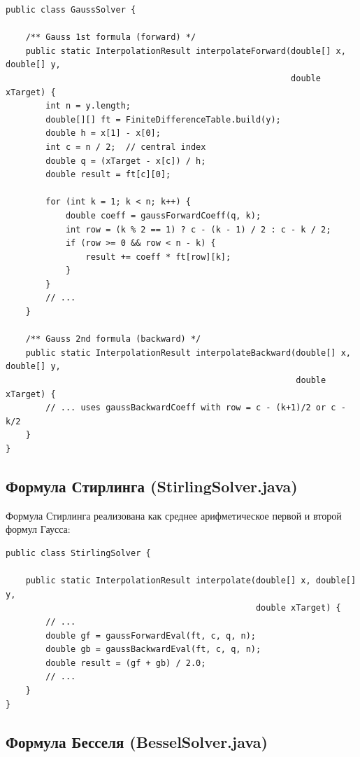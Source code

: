 \begin{lstlisting}[style=javaStyle, label=code:gauss]
public class GaussSolver {

    /** Gauss 1st formula (forward) */
    public static InterpolationResult interpolateForward(double[] x, double[] y,
                                                         double xTarget) {
        int n = y.length;
        double[][] ft = FiniteDifferenceTable.build(y);
        double h = x[1] - x[0];
        int c = n / 2;  // central index
        double q = (xTarget - x[c]) / h;
        double result = ft[c][0];

        for (int k = 1; k < n; k++) {
            double coeff = gaussForwardCoeff(q, k);
            int row = (k % 2 == 1) ? c - (k - 1) / 2 : c - k / 2;
            if (row >= 0 && row < n - k) {
                result += coeff * ft[row][k];
            }
        }
        // ...
    }

    /** Gauss 2nd formula (backward) */
    public static InterpolationResult interpolateBackward(double[] x, double[] y,
                                                          double xTarget) {
        // ... uses gaussBackwardCoeff with row = c - (k+1)/2 or c - k/2
    }
}
\end{lstlisting}

\subsection{Формула Стирлинга (StirlingSolver.java)}

Формула Стирлинга реализована как среднее арифметическое первой и второй формул Гаусса:

\begin{lstlisting}[style=javaStyle, label=code:stirling]
public class StirlingSolver {

    public static InterpolationResult interpolate(double[] x, double[] y,
                                                  double xTarget) {
        // ...
        double gf = gaussForwardEval(ft, c, q, n);
        double gb = gaussBackwardEval(ft, c, q, n);
        double result = (gf + gb) / 2.0;
        // ...
    }
}
\end{lstlisting}

\subsection{Формула Бесселя (BesselSolver.java)}

